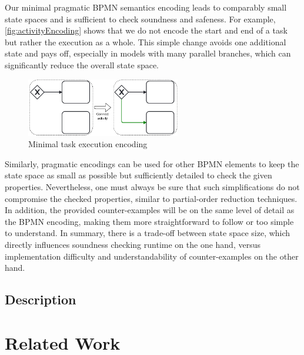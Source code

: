 \documentclass[runningheads]{llncs}
\begin{document}
Our minimal pragmatic BPMN semantics encoding leads to comparably small state spaces and is sufficient to check soundness and safeness.
For example, \autoref{fig:activityEncoding} shows that we do not encode the start and end of a task but rather the execution as a whole.
This simple change avoids one additional state and pays off, especially in models with many parallel branches, which can significantly reduce the overall state space.

\begin{figure}[ht]
	\centering
	\includegraphics[width=0.6\textwidth]{images/dead}
	\caption{Minimal task execution encoding}
	\label{fig:activityEncoding}
\end{figure}

Similarly, pragmatic encodings can be used for other BPMN elements to keep the state space as small as possible but sufficiently detailed to check the given properties.
Nevertheless, one must always be sure that such simplifications do not compromise the checked properties, similar to partial-order reduction techniques.
In addition, the provided counter-examples will be on the same level of detail as the BPMN encoding, making them more straightforward to follow or too simple to understand.
In summary, there is a trade-off between state space size, which directly influences soundness checking runtime on the one hand, versus implementation difficulty and understandability of counter-examples on the other hand.

\subsection{Description}
\cite{camundaservicesgmbhBpmnjs2024}

\section{Related Work}
\end{document}
